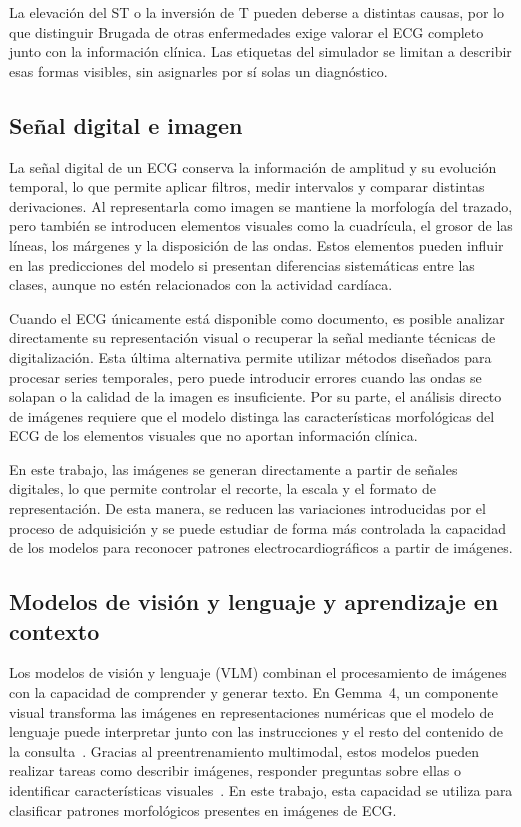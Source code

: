 La elevación del ST o la inversión de T pueden deberse a distintas causas, por lo que distinguir Brugada de otras enfermedades exige valorar el ECG completo junto con la información clínica. Las etiquetas del simulador se limitan a describir esas formas visibles, sin asignarles por sí solas un diagnóstico.

\subsection{Señal digital e imagen}

La señal digital de un ECG conserva la información de amplitud y su evolución temporal, lo que permite aplicar filtros, medir intervalos y comparar distintas derivaciones. Al representarla como imagen se mantiene la morfología del trazado, pero también se introducen elementos visuales como la cuadrícula, el grosor de las líneas, los márgenes y la disposición de las ondas. Estos elementos pueden influir en las predicciones del modelo si presentan diferencias sistemáticas entre las clases, aunque no estén relacionados con la actividad cardíaca.

Cuando el ECG únicamente está disponible como documento, es posible analizar directamente su representación visual o recuperar la señal mediante técnicas de digitalización. Esta última alternativa permite utilizar métodos diseñados para procesar series temporales, pero puede introducir errores cuando las ondas se solapan o la calidad de la imagen es insuficiente. Por su parte, el análisis directo de imágenes requiere que el modelo distinga las características morfológicas del ECG de los elementos visuales que no aportan información clínica.

En este trabajo, las imágenes se generan directamente a partir de señales digitales, lo que permite controlar el recorte, la escala y el formato de representación. De esta manera, se reducen las variaciones introducidas por el proceso de adquisición y se puede estudiar de forma más controlada la capacidad de los modelos para reconocer patrones electrocardiográficos a partir de imágenes.

\subsection{Modelos de visión y lenguaje y aprendizaje en contexto}
\label{sec:fundamentos_icl}

Los modelos de visión y lenguaje (VLM) combinan el procesamiento de imágenes con la capacidad de comprender y generar texto. En Gemma~4, un componente visual transforma las imágenes en representaciones numéricas que el modelo de lenguaje puede interpretar junto con las instrucciones y el resto del contenido de la consulta~\cite{gemma4card}. Gracias al preentrenamiento multimodal, estos modelos pueden realizar tareas como describir imágenes, responder preguntas sobre ellas o identificar características visuales~\cite{alayrac2022}. En este trabajo, esta capacidad se utiliza para clasificar patrones morfológicos presentes en imágenes de ECG.

